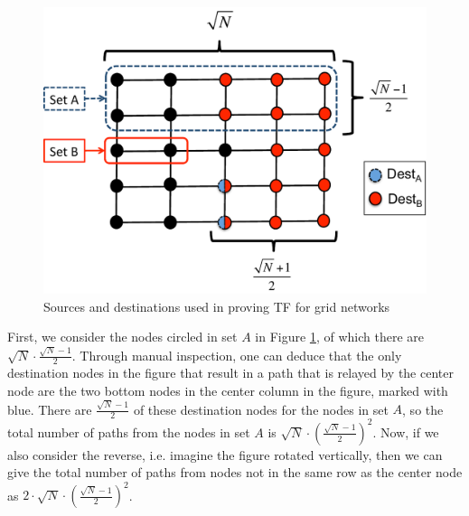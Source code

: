 \begin{figure}
\begin{centering}
    \includegraphics[scale=0.39]{figures/TF_proof_fig_color.pdf}
    \caption{Sources and destinations used in proving TF for grid networks}
    \label{fig:TF_proof_fig}
\end{centering}
\end{figure}

First, we consider the nodes circled in set $A$ in Figure \ref{fig:TF_proof_fig}, of which there are $\sqrt{N} \cdot \frac{\sqrt{N}-1}{2}$.  Through manual inspection, one can deduce that the only destination nodes in the figure that result in a path that is relayed by the center node are the two bottom nodes in the center column in the figure, marked with blue.  
There are $\frac{\sqrt{N}-1}{2}$ of these destination nodes for the nodes in set $A$, so the total number of paths from the nodes in set $A$ is $\sqrt{N} \cdot (\frac{\sqrt{N}-1}{2})^2$.  Now, if we also consider the reverse, i.e. imagine the figure rotated vertically, then we can give the total number of paths from nodes not in the same row as the center node as $2 \cdot \sqrt{N} \cdot (\frac{\sqrt{N}-1}{2})^2$.

